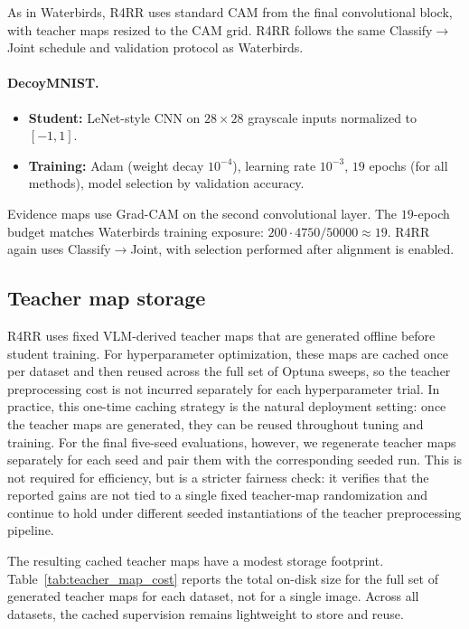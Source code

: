 \documentclass[10pt,twocolumn,letterpaper]{article}
\begin{document}
As in Waterbirds, R4RR uses standard CAM from the final convolutional block, with teacher maps resized to the CAM grid. R4RR follows the same Classify$\rightarrow$Joint schedule and validation protocol as Waterbirds.

\paragraph{DecoyMNIST.}
\begin{itemize}
    \item \textbf{Student:} LeNet-style CNN on $28\times28$ grayscale inputs normalized to $[-1,1]$. 
    \item \textbf{Training:} Adam (weight decay $10^{-4}$), learning rate $10^{-3}$, $19$ epochs (for all methods), model selection by validation accuracy. 
\end{itemize}
Evidence maps use Grad-CAM on the second convolutional layer. The $19$-epoch budget matches Waterbirds training exposure: $200\cdot 4750/50000 \approx 19$. R4RR again uses Classify$\rightarrow$Joint, with selection performed after alignment is enabled.







\subsection{Teacher map storage}
\label{appendix:teacher_map_cost}

R4RR uses fixed VLM-derived teacher maps that are generated offline before student training. For hyperparameter optimization, these maps are cached once per dataset and then reused across the full set of Optuna sweeps, so the teacher preprocessing cost is not incurred separately for each hyperparameter trial. In practice, this one-time caching strategy is the natural deployment setting: once the teacher maps are generated, they can be reused throughout tuning and training. For the final five-seed evaluations, however, we regenerate teacher maps separately for each seed and pair them with the corresponding seeded run. This is not required for efficiency, but is a stricter fairness check: it verifies that the reported gains are not tied to a single fixed teacher-map randomization and continue to hold under different seeded instantiations of the teacher preprocessing pipeline.

The resulting cached teacher maps have a modest storage footprint. Table~\ref{tab:teacher_map_cost} reports the total on-disk size for the full set of generated teacher maps for each dataset, not for a single image. Across all datasets, the cached supervision remains lightweight to store and reuse.
\end{document}

